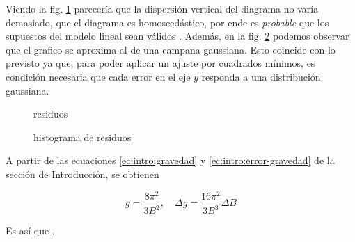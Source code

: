 Viendo la fig. \ref{fig:datos:residuos} parecería que la dispersión vertical
del diagrama no varía demasiado, que el diagrama es homoscedástico, por ende
es \textit{probable} que los supuestos del modelo lineal sean válidos
\cite[págs. 527-528]{estadistica}. Además, en la fig.
\ref{fig:datos:histograma} podemos observar que el grafico se aproxima al
de una campana gaussiana. Esto coincide con lo previsto ya que, para poder
aplicar un ajuste por cuadrados mínimos, es condición necesaria que cada
error en el eje $y$ responda a una distribución gaussiana.

\begin{figure}[H]
    \centering
    
    \caption{residuos}
    \label{fig:datos:residuos}
\end{figure}

\begin{figure}[H]
    \centering
    
    \caption{histograma de residuos}
    \label{fig:datos:histograma}
\end{figure}

A partir de las ecuaciones \ref{ec:intro:gravedad} y
\ref{ec:intro:error-gravedad} de la sección de Introducción, se
obtienen

\[
    g = \frac{8\pi^2}{3B^2}, \quad \Delta g = \frac{16\pi^2}{3B^3} \Delta B
\]

Es así que .
